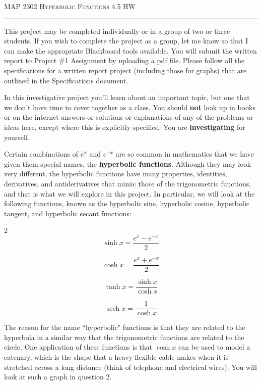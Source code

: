 \documentclass[12pt]{amsart}
\DeclareMathOperator{\sech}{sech}
\begin{document}
\thispagestyle{empty}

{\scshape MAP 2302} \hfill {\scshape \large Hyperbolic Functions} \hfill {4.5 HW\scshape }
 
\smallskip

\hrule

\bigskip

This project may be completed individually or in a group of two or three students.  If you wish to complete the project as a group, let me know so that I can make the appropriate Blackboard tools available.  You will submit the written report to Project \#1 Assignment by uploading a pdf file.  Please follow all the specifications for a written report project (including those for graphs) that are outlined in the Specifications document.

\bigskip

In this investigative project you'll learn about an important topic, but one that we don't have time to cover together as a class.  You should {\bf not} look up in books or on the internet answers or solutions or explanations of any of the problems or ideas here, except where this is explicitly specified.  You are {\bf investigating} for yourself.  

\medskip

Certain combinations of $e^x$ and $e^{-x}$ are so common in mathematics that we have given them special
names, the {\bf hyperbolic functions}. Although they may look very different, the hyperbolic functions
have many properties, identities, derivatives, and antiderivatives that mimic those of the trigonometric functions,
and that is what we will explore in this project. In particular, we will look at the following
functions, known as the hyperbolic sine, hyperbolic cosine, hyperbolic tangent, and hyperbolic
secant functions:
\begin{multicols}{2}
$$\sinh x = \frac{e^x - e^{-x}}{2}$$

$$\cosh x = \frac{e^x + e^{-x}}{2}$$

$$\tanh x = \frac{\sinh x}{\cosh x}$$

$$\sech x = \frac{1}{\cosh x}$$

\end{multicols}

The reason for the name ``hyperbolic" functions is that they are related to the hyperbola in a similar
way that the trigonometric functions are related to the circle. One application of these functions is
that $\cosh x$ can be used to model a catenary, which is the shape that a heavy flexible cable makes
when it is stretched across a long distance (think of telephone and electrical wires). You will look
at such a graph in question 2.
\end{document}
